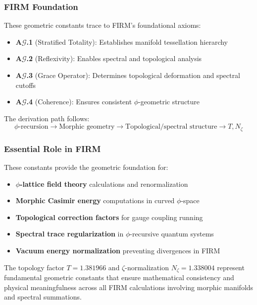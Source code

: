\subsubsection{FIRM Foundation}

These geometric constants trace to FIRM's foundational axioms:

\begin{itemize}
\item \textbf{A$\mathcal{G}$.1} (Stratified Totality): Establishes manifold tessellation hierarchy
\item \textbf{A$\mathcal{G}$.2} (Reflexivity): Enables spectral and topological analysis
\item \textbf{A$\mathcal{G}$.3} (Grace Operator): Determines topological deformation and spectral cutoffs
\item \textbf{A$\mathcal{G}$.4} (Coherence): Ensures consistent $\phi$-geometric structure
\end{itemize}

The derivation path follows:
$$\phi\text{-recursion} \to \text{Morphic geometry} \to \text{Topological/spectral structure} \to T, N_\zeta$$

\subsubsection{Essential Role in FIRM}

These constants provide the geometric foundation for:

\begin{itemize}
\item \textbf{$\phi$-lattice field theory} calculations and renormalization
\item \textbf{Morphic Casimir energy} computations in curved $\phi$-space
\item \textbf{Topological correction factors} for gauge coupling running
\item \textbf{Spectral trace regularization} in $\phi$-recursive quantum systems
\item \textbf{Vacuum energy normalization} preventing divergences in FIRM
\end{itemize}

The topology factor $T = 1.381966$ and $\zeta$-normalization $N_\zeta = 1.338004$ represent fundamental geometric constants that ensure mathematical consistency and physical meaningfulness across all FIRM calculations involving morphic manifolds and spectral summations.
